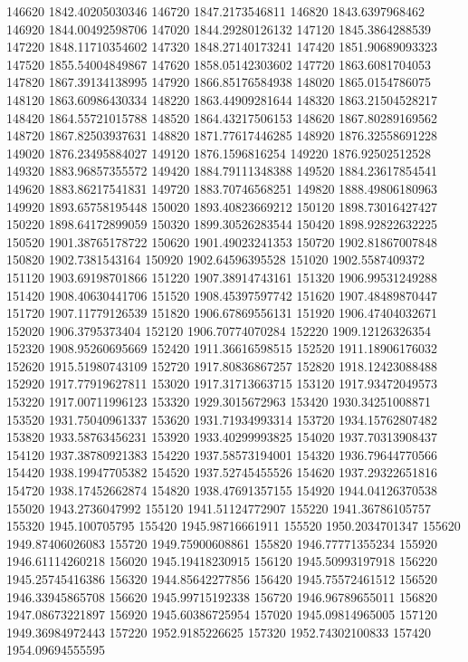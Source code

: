{146620 1842.40205030346
146720 1847.2173546811
146820 1843.6397968462
146920 1844.00492598706
147020 1844.29280126132
147120 1845.3864288539
147220 1848.11710354602
147320 1848.27140173241
147420 1851.90689093323
147520 1855.54004849867
147620 1858.05142303602
147720 1863.6081704053
147820 1867.39134138995
147920 1866.85176584938
148020 1865.0154786075
148120 1863.60986430334
148220 1863.44909281644
148320 1863.21504528217
148420 1864.55721015788
148520 1864.43217506153
148620 1867.80289169562
148720 1867.82503937631
148820 1871.77617446285
148920 1876.32558691228
149020 1876.23495884027
149120 1876.1596816254
149220 1876.92502512528
149320 1883.96857355572
149420 1884.79111348388
149520 1884.23617854541
149620 1883.86217541831
149720 1883.70746568251
149820 1888.49806180963
149920 1893.65758195448
150020 1893.40823669212
150120 1898.73016427427
150220 1898.64172899059
150320 1899.30526283544
150420 1898.92822632225
150520 1901.38765178722
150620 1901.49023241353
150720 1902.81867007848
150820 1902.7381543164
150920 1902.64596395528
151020 1902.5587409372
151120 1903.69198701866
151220 1907.38914743161
151320 1906.99531249288
151420 1908.40630441706
151520 1908.45397597742
151620 1907.48489870447
151720 1907.11779126539
151820 1906.67869556131
151920 1906.47404032671
152020 1906.3795373404
152120 1906.70774070284
152220 1909.12126326354
152320 1908.95260695669
152420 1911.36616598515
152520 1911.18906176032
152620 1915.51980743109
152720 1917.80836867257
152820 1918.12423088488
152920 1917.77919627811
153020 1917.31713663715
153120 1917.93472049573
153220 1917.00711996123
153320 1929.3015672963
153420 1930.34251008871
153520 1931.75040961337
153620 1931.71934993314
153720 1934.15762807482
153820 1933.58763456231
153920 1933.40299993825
154020 1937.70313908437
154120 1937.38780921383
154220 1937.58573194001
154320 1936.79644770566
154420 1938.19947705382
154520 1937.52745455526
154620 1937.29322651816
154720 1938.17452662874
154820 1938.47691357155
154920 1944.04126370538
155020 1943.2736047992
155120 1941.51124772907
155220 1941.36786105757
155320 1945.100705795
155420 1945.98716661911
155520 1950.2034701347
155620 1949.87406026083
155720 1949.75900608861
155820 1946.77771355234
155920 1946.61114260218
156020 1945.19418230915
156120 1945.50993197918
156220 1945.25745416386
156320 1944.85642277856
156420 1945.75572461512
156520 1946.33945865708
156620 1945.99715192338
156720 1946.96789655011
156820 1947.08673221897
156920 1945.60386725954
157020 1945.09814965005
157120 1949.36984972443
157220 1952.9185226625
157320 1952.74302100833
157420 1954.09694555595
}
